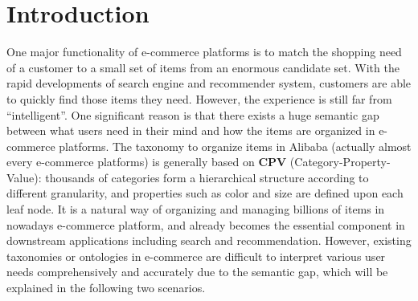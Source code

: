 \section{Introduction}
\label{sec:intro}


One major functionality of e-commerce platforms is to match the shopping need of a customer to a small set of items from an enormous candidate set.
With the rapid developments of search engine and recommender system,
customers are able to quickly find those items they need.
However, the experience is still far from ``intelligent''.
One significant reason is that there exists a huge semantic gap between what users need in their mind and how the items are organized in e-commerce platforms.
The taxonomy to organize items in Alibaba (actually almost every e-commerce platforms) is generally based on \textbf{CPV} (Category-Property-Value):
thousands of categories form a hierarchical structure according to different granularity, and properties such as color and size are defined upon each leaf node.
It is a natural way of organizing and managing billions of items in nowadays e-commerce platform, and already becomes the essential component in downstream applications including search and recommendation.
However, existing taxonomies or ontologies in e-commerce are difficult to interpret various user needs comprehensively and accurately due to the semantic gap, which will be explained in the following two scenarios.

